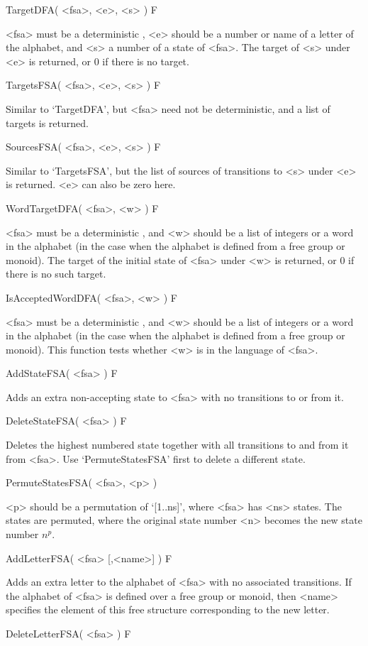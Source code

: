 \>TargetDFA( <fsa>, <e>, <s> ) F

<fsa> must be a deterministic {\fsa}, <e> should be a number or name
of a letter of the alphabet, and <s> a number of a state of <fsa>.
The target of <s> under <e> is returned, or 0 if there is no target.

\>TargetsFSA( <fsa>, <e>, <s> ) F

Similar to `TargetDFA', but <fsa> need not be deterministic, and a list
of targets is returned.

\>SourcesFSA( <fsa>, <e>, <s> ) F

Similar to `TargetsFSA', but the list of sources of transitions to <s>
under <e> is returned. <e> can also be zero here.

\>WordTargetDFA( <fsa>, <w> ) F

<fsa> must be a deterministic {\fsa}, and <w> should be a list of integers
or a word in the alphabet (in the case when the alphabet is defined
from a free group or monoid). The target of the initial state of <fsa>
under <w> is returned, or 0 if there is no such target.

\>IsAcceptedWordDFA( <fsa>, <w> ) F

<fsa> must be a deterministic {\fsa}, and <w> should be a list of integers
or a word in the alphabet (in the case when the alphabet is defined
from a free group or monoid). This function tests whether <w> is in
the language of <fsa>.

\>AddStateFSA( <fsa> ) F

Adds an extra non-accepting state to <fsa> with no transitions to or from it.

\>DeleteStateFSA( <fsa> ) F

Deletes the highest numbered state together with all transitions to and from
it from <fsa>. Use `PermuteStatesFSA' first to delete a different state.

\>PermuteStatesFSA( <fsa>, <p> )

<p> should be a permutation of `[1..ns]', where <fsa> has <ns> states.
The states are permuted, where the original state number <n> becomes
the new state number $n^p$.

\>AddLetterFSA( <fsa> [,<name>] ) F

Adds an extra letter to the alphabet of <fsa> with no associated transitions.
If the alphabet of <fsa> is defined over a free group or monoid, then
<name> specifies the element of this free structure corresponding to
the new letter.

\>DeleteLetterFSA( <fsa> ) F

